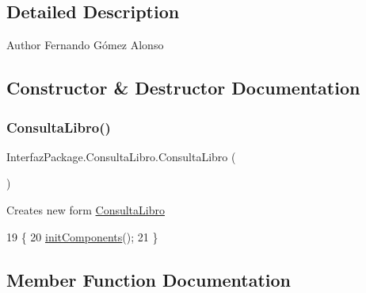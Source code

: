 \subsection{Detailed Description}
\begin{DoxyAuthor}{Author}
Fernando Gómez Alonso 
\end{DoxyAuthor}


\subsection{Constructor \& Destructor Documentation}
\mbox{\label{class_interfaz_package_1_1_consulta_libro_afe8f85b8f90c79821ff3dcecee8f4f5f}} 
\subsubsection{\texorpdfstring{Consulta\+Libro()}{ConsultaLibro()}}
{\footnotesize\ttfamily Interfaz\+Package.\+Consulta\+Libro.\+Consulta\+Libro (\begin{DoxyParamCaption}{ }\end{DoxyParamCaption})\hspace{0.3cm}{\ttfamily [inline]}}

Creates new form \mbox{\hyperlink{class_interfaz_package_1_1_consulta_libro}{Consulta\+Libro}} 
\begin{DoxyCode}
19                            \{
20         \mbox{\hyperlink{class_interfaz_package_1_1_consulta_libro_a00aa9c22f307fe7c3f2b1e16eb651840}{initComponents}}();
21     \}
\end{DoxyCode}


\subsection{Member Function Documentation}
\mbox{\label{class_interfaz_package_1_1_consulta_libro_a00aa9c22f307fe7c3f2b1e16eb651840}} 
